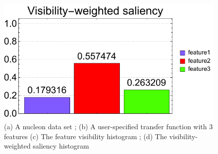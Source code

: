 \begin{figure}
\begin{minipage}{.3\textwidth}
	\subcaption{}
\end{minipage}~
\begin{minipage}{.3\textwidth}
	\includegraphics[width=1\linewidth]{figures/nucleon_naive_proportional_visibility_saliency_weighted_chart}
	\subcaption{}
\end{minipage}
\caption[A nucleon data set]{(a) A nucleon data set \cite{website:Voreen_datasets_2013}; (b) A user-specified transfer function with 3 features (c) The feature visibility histogram \cite{wang_efficient_2011}; (d) The visibility-weighted saliency histogram}
\label{fig:nucleon_naive}
\end{figure}

